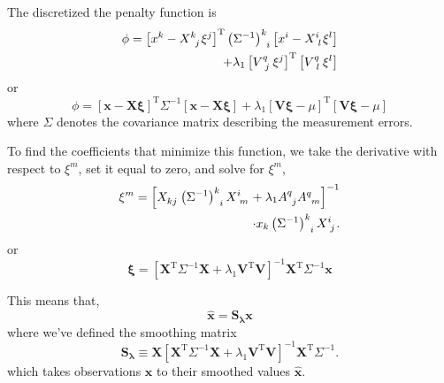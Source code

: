 \documentclass[10pt,journal]{IEEEtran}
\begin{document}
The discretized the penalty function is
\begin{equation}
\begin{split}
\phi = \left[ x^k - X\indices{^k_j} \xi^j \right]^{\textrm{T}} \left(\Sigma^{-1}\right)\indices{^k_i} \left[ x^i - X\indices{^i_l} \xi^l \right] \\
+ \lambda_1 \left[V\indices{^q_j} \xi^j \right]^{\textrm{T}} \left[ V\indices{^q_l} \xi^l \right]
\end{split}
\end{equation}
or
\begin{equation}
\phi = \left[ \mathbf{x} - \mathbf{X} \mathbf{\xi} \right]^{\textrm{T}} \Sigma^{-1} \left[ \mathbf{x} - \mathbf{X} \mathbf{\xi}\right]
+ \lambda_1 \left[\mathbf{V}\mathbf{\xi} - \mu \right]^{\textrm{T}} \left[ \mathbf{V}\mathbf{\xi} - \mu \right]
\end{equation}
where $\Sigma$ denotes the covariance matrix describing the measurement errors.

To find the coefficients that minimize this function, we take the derivative with respect to $\xi^m$, set it equal to zero, and solve for $\xi^m$,
\begin{equation}
\begin{split}
\xi^m = \left[ X\indices{_k_j} \left(\Sigma^{-1}\right)\indices{^k_i}  X\indices{^i_m} + \lambda_1 {A}\indices{^q_j}{A}\indices{^q_m} \right]^{-1} \\
\cdot x_k \left(\Sigma^{-1}\right)\indices{^k_i}   X\indices{^i_j}.
\end{split}
\label{solution}
\end{equation}
or
\begin{equation}
\label{solution2}
\mathbf{\xi} = \left[ \mathbf{X}^{\textrm{T}} \Sigma^{-1} \mathbf{X} + \lambda_1 \mathbf{V}^{\textrm{T}} \mathbf{V} \right]^{-1} \mathbf{X}^{\textrm{T}} \Sigma^{-1} \mathbf{x}
\end{equation}

This means that,
\begin{equation}
\mathbf{\hat{x}} = \mathbf{S_\lambda} \mathbf{x}
\end{equation}
where we've defined the smoothing matrix
\begin{equation}
\label{smoothing-operator}
\mathbf{S_\lambda} \equiv \mathbf{X} \left[ \mathbf{X}^{\textrm{T}} \Sigma^{-1} \mathbf{X} + \lambda_1 \mathbf{V}^{\textrm{T}} \mathbf{V} \right]^{-1} \mathbf{X}^{\textrm{T}} \Sigma^{-1}.
\end{equation}
which takes observations $\mathbf{x}$ to their smoothed values $\mathbf{\hat{x}}$.
\end{document}

